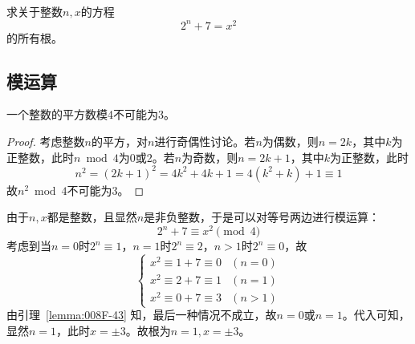 

求关于整数$n, x$的方程
\[ 2^n + 7 = x^2 \]
的所有根。


\subsection{模运算}

\begin{lemma} \label{lemma:008F-43}
  一个整数的平方数模4不可能为3。
\end{lemma}

\begin{proof}
  考虑整数$n$的平方，对$n$进行奇偶性讨论。若$n$为偶数，则$n = 2k$，其中$k$为正整数，此时$n \bmod 4$为0或2。若$n$为奇数，则$n = 2k + 1$，其中$k$为正整数，此时
  \[ n^2 = (2k + 1)^2 = 4k^2 + 4k + 1 = 4\left(k^2 + k\right) + 1 \equiv 1 \]
  故$n^2 \bmod 4$不可能为3。
\end{proof}

由于$n, x$都是整数，且显然$n$是非负整数，于是可以对等号两边进行模运算：
\[ 2^n + 7 \equiv x^2 \pmod 4 \]
考虑到当$n = 0$时$2^n \equiv 1$，$n = 1$时$2^n \equiv 2$，$n > 1$时$2^n \equiv 0$，故
\[ \begin{cases}
  x^2 \equiv 1 + 7 \equiv 0 & (n = 0) \\
  x^2 \equiv 2 + 7 \equiv 1 & (n = 1) \\
  x^2 \equiv 0 + 7 \equiv 3 & (n > 1)
\end{cases} \]
由引理~\ref{lemma:008F-43} 知，最后一种情况不成立，故$n = 0$或$n = 1$。代入可知，显然$n = 1$，此时$x = \pm3$。故根为$n = 1, x = \pm3$。
